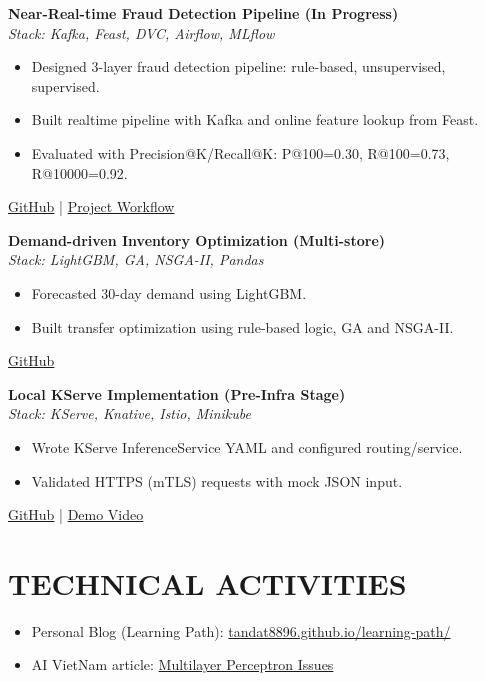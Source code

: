 \documentclass[a4paper,10pt]{extarticle}
\begin{document}
\textbf{Near-Real-time Fraud Detection Pipeline (In Progress)}\\
\textit{Stack: Kafka, Feast, DVC, Airflow, MLflow}\\
\begin{itemize}
  \item Designed 3-layer fraud detection pipeline: rule-based, unsupervised, supervised.
  \item Built realtime pipeline with Kafka and online feature lookup from Feast.
  \item Evaluated with Precision@K/Recall@K: P@100=0.30, R@100=0.73, R@10000=0.92.
\end{itemize}
\faGithub\;\href{https://github.com/tandat8896/fraud_rt_projects}{GitHub}
\;|\;
\faYoutube\;\href{https://www.youtube.com/watch?v=AtsQwF9pSVg&list=PLRkwChN4lOmfjJLMB9fVPjxvJeA0QUNti}{Project Workflow}

\vspace{4pt}

\textbf{Demand-driven Inventory Optimization (Multi-store)}\\
\textit{Stack: LightGBM, GA, NSGA-II, Pandas}\\
\begin{itemize}
  \item Forecasted 30-day demand using LightGBM.
  \item Built transfer optimization using rule-based logic, GA and NSGA-II.
\end{itemize}
\faGithub\;\href{https://github.com/tandat8896/demand-driven-inventory-optimazer}{GitHub}

\vspace{4pt}

\textbf{Local KServe Implementation (Pre-Infra Stage)}\\
\textit{Stack: KServe, Knative, Istio, Minikube}\\
\begin{itemize}
  \item Wrote KServe InferenceService YAML and configured routing/service.
  \item Validated HTTPS (mTLS) requests with mock JSON input.
\end{itemize}
\faGithub\;\href{https://github.com/tandat8896/sales-forecasting-end-to-end}{GitHub}
\;|\;
\faYoutube\;\href{https://youtu.be/qJGMT12w4OE}{Demo Video}

\section*{TECHNICAL ACTIVITIES}
\begin{itemize}
  \item Personal Blog (Learning Path): \href{https://tandat8896.github.io/learning-path/}{tandat8896.github.io/learning-path/}
  \item AI VietNam article: \href{https://aioconquer.aivietnam.edu.vn/posts/multilayer-perceptron-issues-gradient-vanishing-dying-relu-zero-initialization-explained}{Multilayer Perceptron Issues}
\end{itemize}
\end{document}
